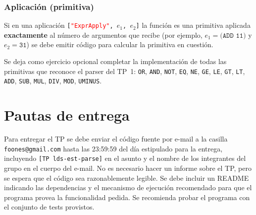 \documentclass{article}
\newcommand{\astkw}[1]{\texttt{\textcolor{red}{"#1"}}}
\begin{document}
\subsubsection{Aplicación (primitiva)}
Si en una aplicación \texttt{[\astkw{ExprApply}, $e_1$, $e_2$]}
la función es una primitiva aplicada {\bf exactamente} al número de
argumentos que recibe
(por ejemplo, $e_1 = \texttt{(ADD 11)}$ y $e_2 = \texttt{31}$)
se debe emitir código para calcular la primitiva en cuestión.

Se deja como ejercicio opcional
completar la implementación de todas las
primitivas que reconoce el parser del TP~1:
\texttt{OR},
\texttt{AND},
\texttt{NOT},
\texttt{EQ},
\texttt{NE},
\texttt{GE},
\texttt{LE},
\texttt{GT},
\texttt{LT},
\texttt{ADD},
\texttt{SUB},
\texttt{MUL},
\texttt{DIV},
\texttt{MOD},
\texttt{UMINUS}.

\section{Pautas de entrega}

Para entregar el TP se debe enviar el c\'odigo fuente por e-mail
a la casilla \texttt{foones@gmail.com} hasta las 23:59:59 del d\'ia
estipulado para la entrega, incluyendo \texttt{[TP lds-est-parse]} en
el asunto y el nombre de los integrantes del grupo en el cuerpo
del e-mail. No es necesario hacer un informe sobre el TP, pero se espera
que el c\'odigo sea razonablemente legible.
Se debe incluir un README
indicando las dependencias y el mecanismo de ejecuci\'on
recomendado para que el programa provea la funcionalidad pedida.
Se recomienda probar el programa con el conjunto de tests provistos.
\end{document}
